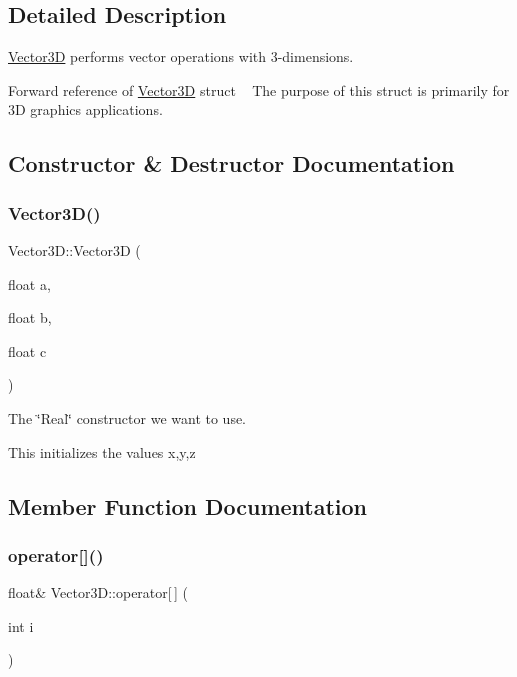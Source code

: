 \subsection{Detailed Description}
\mbox{\hyperlink{struct_vector3_d}{Vector3D}} performs vector operations with 3-\/dimensions. 

Forward reference of \mbox{\hyperlink{struct_vector3_d}{Vector3D}} struct ~\newline
The purpose of this struct is primarily for 3D graphics applications. 

\subsection{Constructor \& Destructor Documentation}
\mbox{\label{struct_vector3_d_a7b0f18fa43c7a90588dedcd814122359}} 
\subsubsection{\texorpdfstring{Vector3\+D()}{Vector3D()}}
{\footnotesize\ttfamily Vector3\+D\+::\+Vector3D (\begin{DoxyParamCaption}\item[{float}]{a,  }\item[{float}]{b,  }\item[{float}]{c }\end{DoxyParamCaption})\hspace{0.3cm}{\ttfamily [inline]}}



The \char`\"{}\+Real\char`\"{} constructor we want to use. 

This initializes the values x,y,z 

\subsection{Member Function Documentation}
\mbox{\label{struct_vector3_d_a9ada0b9382fdaf3bade67438f829280d}} 
\subsubsection{\texorpdfstring{operator[]()}{operator[]()}\hspace{0.1cm}{\footnotesize\ttfamily [1/2]}}
{\footnotesize\ttfamily float\& Vector3\+D\+::operator\mbox{[}$\,$\mbox{]} (\begin{DoxyParamCaption}\item[{int}]{i }\end{DoxyParamCaption})\hspace{0.3cm}{\ttfamily [inline]}}



